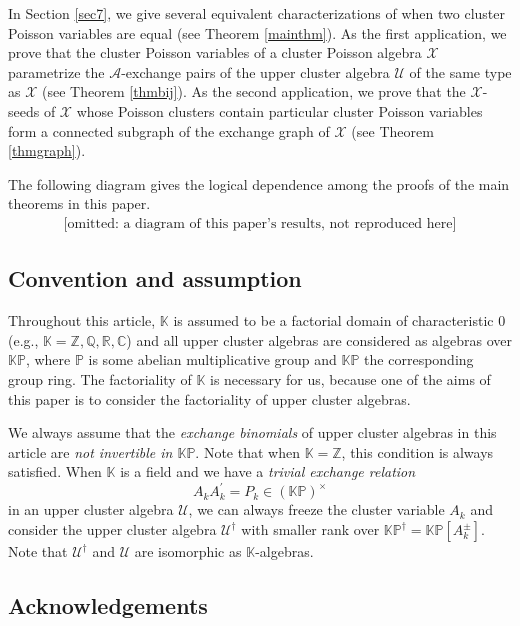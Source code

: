 \documentclass{amsart}
\theoremstyle{definition}
\theoremstyle{remark}
\numberwithin{equation}{section}
\begin{document}
In Section \ref{sec7}, we give several equivalent characterizations of when two cluster Poisson variables are equal (see Theorem \ref{mainthm}).  As the first application, we prove that the cluster Poisson variables of a cluster Poisson algebra $\mathcal X$ parametrize the $\mathscr A$-exchange pairs of the upper cluster algebra $\mathcal U$ of the same type as $\mathcal X$ (see Theorem \ref{thmbij}).  As the second application, we prove that the $\mathscr X$-seeds of  $\mathcal X$ whose Poisson clusters contain particular cluster Poisson variables form a connected subgraph of the exchange graph of  $\mathcal X$ (see Theorem \ref{thmgraph}).


 The following diagram gives  the logical dependence among the proofs of the main theorems in this paper.
$$
\begin{array}{ccc}
\mbox{[omitted: a diagram of this paper's results, not reproduced here]}
\end{array}
$$
\subsection{Convention and assumption} \label{rmkexbi}
  Throughout this article,   $\mathbb K$ is assumed to be a factorial domain of characteristic $0$ (e.g., $\mathbb K=\mathbb Z, \mathbb Q, \mathbb R, \mathbb C$)
and all upper cluster algebras are considered as algebras over $\mathbb {KP}$, where $\mathbb P$ is some abelian multiplicative group and $\mathbb{KP}$ the corresponding group ring. The factoriality of $\mathbb K$ is necessary for us, because one of the aims of this paper is to consider the factoriality of upper cluster algebras.


 We always assume that the {\em exchange binomials} of upper cluster algebras in this article are {\em not invertible in $\mathbb {KP}$}. Note that when $\mathbb K=\mathbb Z$, this condition is always satisfied. When $\mathbb K$ is a field and we have a {\em trivial exchange relation} $$A_{k}A_k^\prime=P_k\in(\mathbb{KP})^\times$$ in an upper cluster algebra $\mathcal U$,  we can always freeze the cluster variable $A_k$ and consider the upper cluster algebra $\mathcal U^\dag$ with smaller rank over $\mathbb {KP}^\dag=\mathbb {KP}[A_k^\pm]$. Note that $\mathcal U^\dag$ and $\mathcal U$ are isomorphic as $\mathbb K$-algebras.


\subsection*{Acknowledgements}
\end{document}
